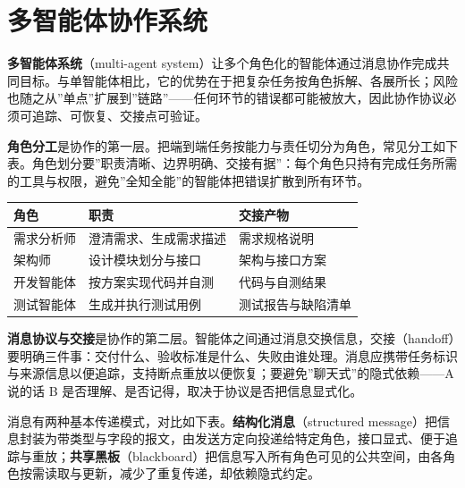 \documentclass[12pt,a4paper,twoside,openany]{ctexbook}
\numberwithin{figure}{chapter}
\numberwithin{table}{chapter}
\newcounter{none}
\begin{document}
\section{多智能体协作系统}\label{ux591aux667aux80fdux4f53ux534fux4f5cux7cfbux7edf}

\textbf{多智能体系统}（multi-agent
system）让多个角色化的智能体通过消息协作完成共同目标。与单智能体相比，它的优势在于把复杂任务按角色拆解、各展所长；风险也随之从''单点''扩展到''链路''------任何环节的错误都可能被放大，因此协作协议必须可追踪、可恢复、交接点可验证。

\textbf{角色分工}是协作的第一层。把端到端任务按能力与责任切分为角色，常见分工如下表。角色划分要''职责清晰、边界明确、交接有据''：每个角色只持有完成任务所需的工具与权限，避免''全知全能''的智能体把错误扩散到所有环节。

{\def\LTcaptype{none} %
\begin{longtable}[]{@{}lll@{}}
\toprule\noalign{}
角色 & 职责 & 交接产物 \\
\midrule\noalign{}
\endhead
\bottomrule\noalign{}
\endlastfoot
需求分析师 & 澄清需求、生成需求描述 & 需求规格说明 \\
架构师 & 设计模块划分与接口 & 架构与接口方案 \\
开发智能体 & 按方案实现代码并自测 & 代码与自测结果 \\
测试智能体 & 生成并执行测试用例 & 测试报告与缺陷清单 \\
\end{longtable}
}

\textbf{消息协议与交接}是协作的第二层。智能体之间通过消息交换信息，交接（handoff）要明确三件事：交付什么、验收标准是什么、失败由谁处理。消息应携带任务标识与来源信息以便追踪，支持断点重放以便恢复；要避免''聊天式''的隐式依赖------A
说的话 B 是否理解、是否记得，取决于协议是否把信息显式化。

消息有两种基本传递模式，对比如下表。\textbf{结构化消息}（structured
message）把信息封装为带类型与字段的报文，由发送方定向投递给特定角色，接口显式、便于追踪与重放；\textbf{共享黑板}（blackboard）把信息写入所有角色可见的公共空间，由各角色按需读取与更新，减少了重复传递，却依赖隐式约定。
\end{document}
